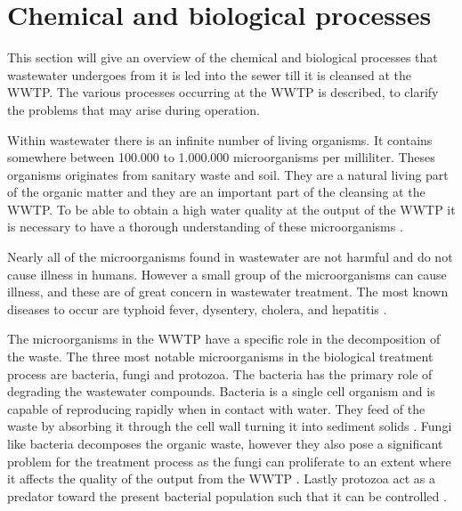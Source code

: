 \section{Chemical and biological processes}\label{se:chemical_process}
This section will give an overview of the chemical and biological processes that wastewater undergoes from it is led into the sewer till it is cleansed at the WWTP. The various processes occurring at the WWTP is described, to clarify the problems that may arise during operation. 

Within wastewater there is an infinite number of living organisms.%
It contains somewhere between 100.000 to 1.000.000 microorganisms per milliliter. Theses organisms originates from sanitary waste and soil. They are a natural living part of the organic matter and they are an important part of the cleansing at the WWTP. To be able to obtain a high water quality at the output of the WWTP it is necessary to have a thorough understanding of these microorganisms \cite{biological_wastewater}. %

Nearly all of the microorganisms found in wastewater are not harmful and do not cause illness in humans. However a small group of the microorganisms can cause illness, and these are of great concern in wastewater treatment. The most known diseases to occur are typhoid fever, dysentery, cholera, and hepatitis \cite{biological_wastewater}.

The microorganisms in the WWTP have a specific role in the decomposition of the waste. The three most notable microorganisms in the biological treatment process are bacteria, fungi and protozoa. The bacteria has the primary role of degrading the wastewater compounds.  Bacteria is a single cell organism and is capable of reproducing rapidly when in contact with water. They feed of the waste by absorbing it through the cell wall turning it into sediment solids \cite{biological_wastewater}. 
Fungi like bacteria decomposes the organic waste, however they also pose a significant problem for the treatment process as the fungi can proliferate to an extent where it affects the quality of the output from the WWTP \cite{fungi_source}. 
Lastly protozoa act as a predator toward the present bacterial population such that it can be controlled \cite{biological_wastewater}. 

